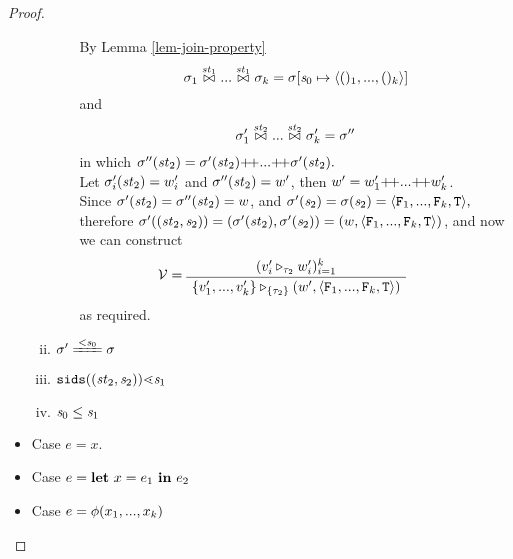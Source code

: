 \begin{proof}
\begin{itemize}
\begin{enumerate}[(i)]
\begin{itemize}
	    By Lemma \ref{lem-join-property} 
	    $${\sgm_1 \x{\st_1} ... \x{\st_1} \sgm_k} = \sgm[\s_0 \|-> \<()_1,...,()_k \'>]$$
	    and
	    $$\sigma_1' \stackrel{\mathit{st}_2}{\bowtie} ... \stackrel{\mathit{st}_2}{\bowtie} \sigma'_k = \sigma''$$ 
	    in which $\sgm''(\st_2) = \sgm'(\st_2) {\++} ... {\++} \sgm'(\st_2).$\\
		Let $\sigma'_i(\mathit{st}_2) = w'_i$ and  $\sigma''(\mathit{st}_2) = w'$, then
		$w' = w'_1 {\++} ... {\++} w'_k$. \\
		
	    Since $\sigma'(\mathit{st}_2) = \sigma''(\mathit{st}_2) = w$, and $\sgm'(\s_2) = \sgm(\s_2) = \< \F_1,...,\F_k,\T \'>,$
	    therefore $\sgm'((\st_2,\s_2)) = (\sgm'(\st_2),\sgm'(\s_2)) = (w,\< \F_1,...,\F_k,\T \'>)$, and now we can construct
	    $$\MV = 
	    \PT{
	    	\AC{(\ValRep{v'_i}{\tau_2}{w'_i})^k_{i=1}}
	    	\UC{\ValRep{\Seqk{v'}}{\tseq{\tau_2}}{(w',\< \F_1,..., \F_k, \T \'>)}}
	    }$$ as required.
		
	\end{itemize}
	
	\item $\sgm' \ConEq{\s_0} \sgm$
	\item $\sids{(\st_2,\s_2)} {\.<} \s_1$ 
	\item $\mathit{s}_0 \le \mathit{s}_1$ 
	
	\end{enumerate}
 
 \item Case $e = x$.
 \item Case $e = \mathbf{let} \ x = e_1 \ \mathbf{in} \ e_2$
 \item Case $e = \phi(x_1,...,x_k)$	
	\end{itemize}	
\end{proof}

